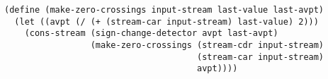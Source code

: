 \documentclass[a4paper,12pt]{article}
\begin{document}
\begin{lstlisting}
(define (make-zero-crossings input-stream last-value last-avpt)
  (let ((avpt (/ (+ (stream-car input-stream) last-value) 2)))
    (cons-stream (sign-change-detector avpt last-avpt)
                 (make-zero-crossings (stream-cdr input-stream)
                                      (stream-car input-stream)
                                      avpt))))
\end{lstlisting}
\end{document}
